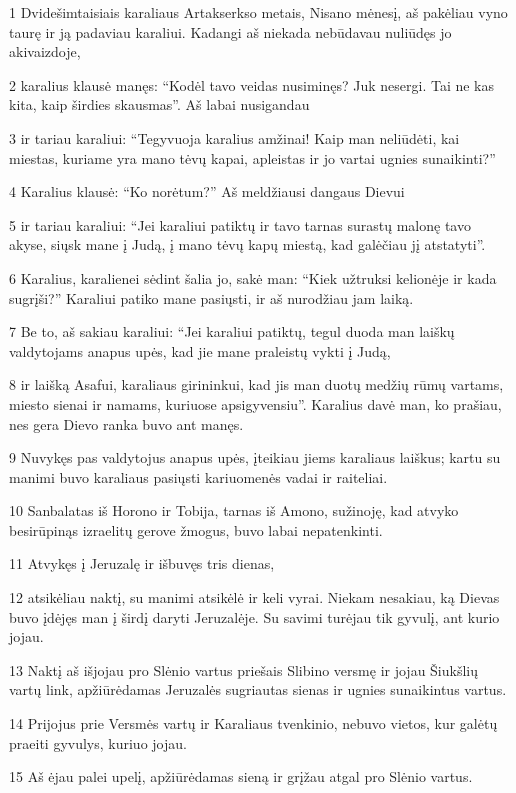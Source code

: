 \par 1 Dvidešimtaisiais karaliaus Artakserkso metais, Nisano mėnesį, aš pakėliau vyno taurę ir ją padaviau karaliui. Kadangi aš niekada nebūdavau nuliūdęs jo akivaizdoje, 
\par 2 karalius klausė manęs: “Kodėl tavo veidas nusiminęs? Juk nesergi. Tai ne kas kita, kaip širdies skausmas”. Aš labai nusigandau 
\par 3 ir tariau karaliui: “Tegyvuoja karalius amžinai! Kaip man neliūdėti, kai miestas, kuriame yra mano tėvų kapai, apleistas ir jo vartai ugnies sunaikinti?” 
\par 4 Karalius klausė: “Ko norėtum?” Aš meldžiausi dangaus Dievui 
\par 5 ir tariau karaliui: “Jei karaliui patiktų ir tavo tarnas surastų malonę tavo akyse, siųsk mane į Judą, į mano tėvų kapų miestą, kad galėčiau jį atstatyti”. 
\par 6 Karalius, karalienei sėdint šalia jo, sakė man: “Kiek užtruksi kelionėje ir kada sugrįši?” Karaliui patiko mane pasiųsti, ir aš nurodžiau jam laiką. 
\par 7 Be to, aš sakiau karaliui: “Jei karaliui patiktų, tegul duoda man laiškų valdytojams anapus upės, kad jie mane praleistų vykti į Judą, 
\par 8 ir laišką Asafui, karaliaus girininkui, kad jis man duotų medžių rūmų vartams, miesto sienai ir namams, kuriuose apsigyvensiu”. Karalius davė man, ko prašiau, nes gera Dievo ranka buvo ant manęs. 
\par 9 Nuvykęs pas valdytojus anapus upės, įteikiau jiems karaliaus laiškus; kartu su manimi buvo karaliaus pasiųsti kariuomenės vadai ir raiteliai. 
\par 10 Sanbalatas iš Horono ir Tobija, tarnas iš Amono, sužinoję, kad atvyko besirūpinąs izraelitų gerove žmogus, buvo labai nepatenkinti. 
\par 11 Atvykęs į Jeruzalę ir išbuvęs tris dienas, 
\par 12 atsikėliau naktį, su manimi atsikėlė ir keli vyrai. Niekam nesakiau, ką Dievas buvo įdėjęs man į širdį daryti Jeruzalėje. Su savimi turėjau tik gyvulį, ant kurio jojau. 
\par 13 Naktį aš išjojau pro Slėnio vartus priešais Slibino versmę ir jojau Šiukšlių vartų link, apžiūrėdamas Jeruzalės sugriautas sienas ir ugnies sunaikintus vartus. 
\par 14 Prijojus prie Versmės vartų ir Karaliaus tvenkinio, nebuvo vietos, kur galėtų praeiti gyvulys, kuriuo jojau. 
\par 15 Aš ėjau palei upelį, apžiūrėdamas sieną ir grįžau atgal pro Slėnio vartus. 

